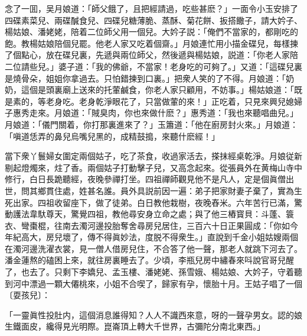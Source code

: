 念了一囬，吴月娘道：「師父餓了，且把經請過，吃些甚麽？」一面令小玉安排了四碟素菜兒、兩碟醎食兒、四碟兒糖薄脆、蒸酥、菊花餅、扳搭饊子，請大妗子、楊姑娘、潘姥姥，陪着二位師父用一個兒。大妗子説：「俺們不當家的，都剛吃的飽。教楊姑娘陪個兒罷。他老人家又吃着個齋。」月娘連忙用小描金碟兒，每樣揀了個點心，放在碟兒裏，先遞與兩位師父，然後遞與楊姑娘，説道：「你老人家陪二位請些兒。」婆子道：「我的佛爺，不當家！老身吃的可夠了。」又道：「這碟兒裏是燒骨朵，姐姐你拿過去。只怕錯揀到口裏。」把衆人笑的了不得。月娘道：「奶奶，這個是頭裏廟上送來的托葷鹹食，你老人家只顧用，不妨事。」楊姑娘道：「既是素的，等老身吃。老身乾淨眼花了，只當做葷的來！」正吃着，只見來興兒媳婦子惠秀走來。月娘道：「賊臭肉，你也來做什麽？」惠秀道：「我也來聽唱曲兒。」月娘道：「儀門關着，你打那裏進來了？」玉簫道：「他在廚房封火來。」月娘道：「嗔道恁弄的鼻兒烏嘴兒黑的，成精鼓搗，來聽什麽經！」

當下衆丫鬟婦女圍定兩個姑子，吃了茶食，收過家活去，搽抹經桌乾淨。月娘従新剔起燈燭來，炷了香。兩個姑子打動擊子兒，又高念起來。從張員外在黄梅山寺中修行，白日長跪聽經，夜晚參禪打坐。四祖禪師觀見他不是凡人，定是個眞僧出世，問其鄉貫住處，姓甚名誰。員外具説前因一遍：弟子把家財妻子棄了，實為生死出家。四祖收留座下，做了徒弟。白日教他栽樹，夜晚舂米。六年苦行已滿，驚動護法韋馱尊天，驚覺四祖，教他尋安身立命之處；與了他三樁寳貝：斗蓬、簑衣、彎棗棍，往南去濁河邊投胎奪舍尋房兒居住，三百六十日正果圓成：「你如今年紀高大，房兒壞了，傳不得眞妙法，度脱不得衆生。」直說到千金小姐姑嫂兩個在濁河邊洗濯衣裳，見一僧人借房兒住，不合答了他一聲，那老人就跳下河去了。潘金蓮熬的磕困上來，就往房裏睡去了。少頃，李瓶兒房中繡春來呌說官哥兒醒了，也去了。只剩下李嬌兒、孟玉樓、潘姥姥、孫雪娥、楊姑娘、大妗子，守着聽到河中漂過一顆大僊桃來，小姐不合喫了，歸家有孕，懷胎十月。王姑子唱了一個〔耍孩兒〕：

\begin{myquote}
「一靈眞性投肚内，這個消息誰得知？人人不識西來意，呀的一聲孕男女。認的娘生鐵面皮，纔得見光明際。崑崙頂上轉大千世界，古彌陀分南北東西。」

\end{myquote}

